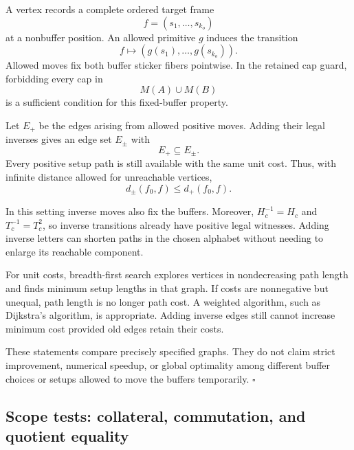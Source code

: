 \documentclass[
  10pt,
  a4paper,
]{article}
\begin{document}
A vertex records a complete ordered target frame \begin{equation}
f=(s_1,\ldots,s_{k_o})
\end{equation} at a nonbuffer position. An allowed primitive \(g\)
induces the transition \begin{equation}
f\longmapsto(g(s_1),\ldots,g(s_{k_o})).
\end{equation} Allowed moves fix both buffer sticker fibers pointwise.
In the retained cap guard, forbidding every cap in \begin{equation}
M(A)\cup M(B)
\end{equation} is a sufficient condition for this fixed-buffer property.

Let \(E_+\) be the edges arising from allowed positive moves. Adding
their legal inverses gives an edge set \(E_{\pm}\) with \begin{equation}
E_+\subseteq E_{\pm}.
\end{equation} Every positive setup path is still available with the
same unit cost. Thus, with infinite distance allowed for unreachable
vertices, \begin{equation}
d_{\pm}(f_0,f)\le d_+(f_0,f).
\end{equation}

In this setting inverse moves also fix the buffers. Moreover,
\(H_c^{-1}=H_c\) and \(T_c^{-1}=T_c^2\), so inverse transitions already
have positive legal witnesses. Adding inverse letters can shorten paths
in the chosen alphabet without needing to enlarge its reachable
component.

For unit costs, breadth-first search explores vertices in nondecreasing
path length and finds minimum setup lengths in that graph. If costs are
nonnegative but unequal, path length is no longer path cost. A weighted
algorithm, such as Dijkstra's algorithm, is appropriate. Adding inverse
edges still cannot increase minimum cost provided old edges retain their
costs.

These statements compare precisely specified graphs. They do not claim
strict improvement, numerical speedup, or global optimality among
different buffer choices or setups allowed to move the buffers
temporarily. \(\square\)

\subsection{Scope tests: collateral, commutation, and quotient
equality}\label{scope-tests-collateral-commutation-and-quotient-equality}
\end{document}
